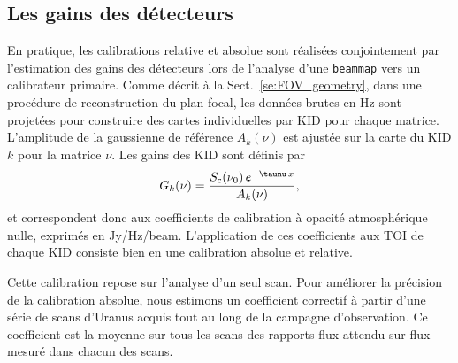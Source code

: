\subsection{Les gains des détecteurs}
\label{se:gains}

En pratique, les calibrations relative et absolue sont réalisées
conjointement par l'estimation des gains des détecteurs lors de
l'analyse d'une {\tt beammap} vers un calibrateur primaire. Comme
décrit à la Sect.~\ref{se:FOV_geometry}, dans une procédure de
reconstruction du plan focal, les données brutes en Hz sont projetées
pour construire des cartes individuelles par KID pour chaque
matrice. L'amplitude de la gaussienne de
référence $A_k(\nu)$ est ajustée sur la carte du KID $k$ pour la
matrice $\nu$. Les gains des KID sont définis par
\begin{equation}
  G_k(\nu) = \frac{S_{\rm{c}}(\nu_0)\, e^{-\taunu\,x}}{A_k(\nu)},
  \label{eq:kid_gain}
\end{equation}
et correspondent donc aux coefficients de calibration à opacité
atmosphérique nulle, exprimés en Jy/Hz/beam. L'application de ces
coefficients aux TOI de chaque KID consiste bien en une calibration
absolue et relative.


Cette calibration repose sur l'analyse d'un seul scan. Pour améliorer
la précision de la calibration absolue, nous estimons un coefficient
correctif à partir d'une série de scans d'Uranus acquis tout au long
de la campagne d'observation. Ce coefficient est la moyenne sur tous
les scans des rapports flux attendu sur flux mesuré dans chacun des
scans.

